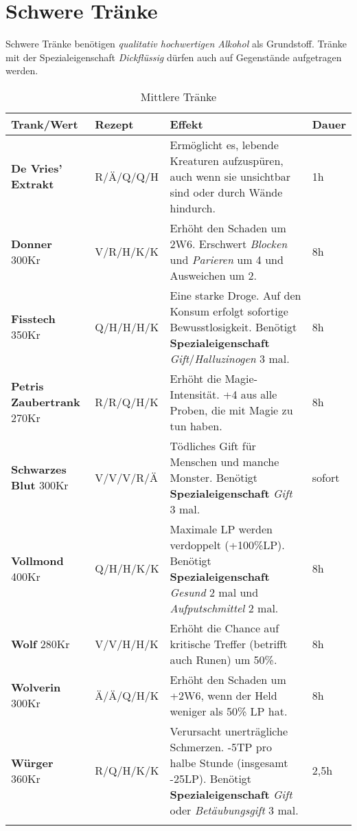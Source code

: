 \newpage

\section{Schwere Tränke}
Schwere Tränke benötigen \textit{qualitativ hochwertigen Alkohol} als Grundstoff. Tränke mit der Spezialeigenschaft \textit{Dickflüssig} dürfen auch auf Gegenstände aufgetragen werden.

\begin{longtable}{|p{3cm}|p{}|p{8cm}|p{}|}
\hline
\textbf{Trank/Wert} & \textbf{Rezept} & \textbf{Effekt} & \textbf{Dauer} \\ \hline

\textbf{De Vries' Extrakt} & R/Ä/Q/Q/H & Ermöglicht es, lebende Kreaturen aufzuspüren, auch wenn sie unsichtbar sind oder durch Wände hindurch. & 1h \\ \hline

\textbf{Donner} 300Kr & V/R/H/K/K & Erhöht den Schaden um 2W6. Erschwert \textit{Blocken} und \textit{Parieren} um 4 und Ausweichen um 2. & 8h \\ \hline 

\textbf{Fisstech} 350Kr & Q/H/H/H/K & Eine starke Droge. Auf den Konsum erfolgt sofortige Bewusstlosigkeit. Benötigt \textbf{Spezialeigenschaft} \textit{Gift}/\textit{Halluzinogen} 3 mal. & 8h \\ \hline

\textbf{Petris Zaubertrank} 270Kr & R/R/Q/H/K & Erhöht die Magie-Intensität. +4 aus alle Proben, die mit Magie zu tun haben. & 8h \\ \hline

\textbf{Schwarzes Blut} 300Kr & V/V/V/R/Ä & Tödliches Gift für Menschen und manche Monster. Benötigt \textbf{Spezialeigenschaft} \textit{Gift} 3 mal. & sofort \\ \hline

\textbf{Vollmond} 400Kr & Q/H/H/K/K & Maximale LP werden verdoppelt (+100\%LP). Benötigt \textbf{Spezialeigenschaft} \textit{Gesund} 2 mal und \textit{Aufputschmittel} 2 mal. & 8h \\ \hline

\textbf{Wolf} 280Kr & V/V/H/H/K & Erhöht die Chance auf kritische Treffer (betrifft auch Runen) um 50\%. & 8h \\ \hline

\textbf{Wolverin} 300Kr & Ä/Ä/Q/H/K & Erhöht den Schaden um +2W6, wenn der Held weniger als 50\% LP hat. & 8h \\ \hline

\textbf{Würger} 360Kr & R/Q/H/K/K & Verursacht unerträgliche Schmerzen. -5TP pro halbe Stunde (insgesamt -25LP). Benötigt \textbf{Spezialeigenschaft} \textit{Gift} oder \textit{Betäubungsgift} 3 mal. & 2,5h \\ \hline

\caption{Mittlere Tränke}
\label{tab:mittlere_traenke}
\end{longtable}


